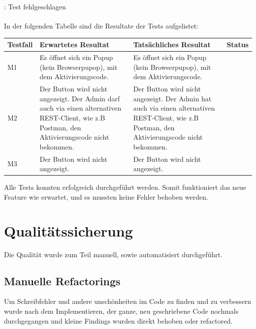 \textcolor{red}{}   : Test fehlgeschlagen\\
\\
In der folgenden Tabelle sind die Resultate der Tests aufgelistet: \newpage
\begin{longtable}{|p{}|p{}|p{}|p{}|}
	\hline
	\textbf{Testfall} & \textbf{Erwartetes Resultat} & \textbf{Tatsächliches Resultat} &\textbf{Status} \\ \hline
	M1 & Es öffnet sich ein Popup (kein Browserpupop), mit dem Aktivierungscode.  & Es öffnet sich ein Popup (kein Browserpupop), mit dem Aktivierungscode. &  \textcolor{green}{\checkmark} \\ \hline 
	M2 & Der Button wird nicht angezeigt. Der Admin darf auch via einen alternativen REST-Client, wie z.B Postman, den Aktivierungscode nicht bekommen. & Der Button wird nicht angezeigt. Der Admin hat auch via einen alternativen REST-Client, wie z.B Postman, den Aktivierungscode nicht bekommen. & \textcolor{green}{\checkmark} \\ \hline 
	M3 & Der Button wird nicht angezeigt.  &  Der Button wird nicht angezeigt.   & \textcolor{green}{\checkmark} \\ \hline 
\end{longtable}
\noindent Alle Tests konnten erfolgreich durchgeführt werden. Somit funktioniert das neue Feature wie erwartet, und es mussten keine Fehler behoben werden.

\section{Qualitätssicherung}
Die Qualität wurde zum Teil manuell, sowie automatisiert durchgeführt.
\subsection{Manuelle Refactorings}
Um Schreibfehler und andere unschönheiten im Code zu finden und zu verbessern wurde nach dem Implementieren, der ganze, neu geschriebene Code nochmals durchgegangen und kleine Findings wurden direkt behoben oder refactored.

